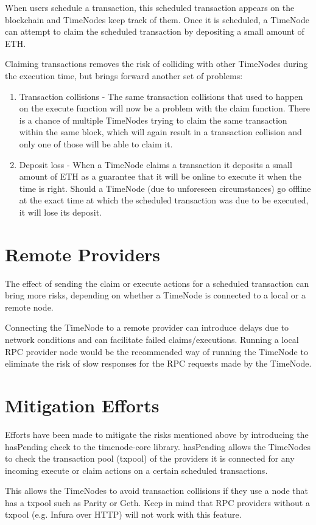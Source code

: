 \documentclass{report}
\begin{document}
  When users schedule a transaction, this scheduled transaction appears on the blockchain and TimeNodes keep track of them. Once it is scheduled, a TimeNode can attempt to claim the scheduled transaction by depositing a small amount of ETH.

  Claiming transactions removes the risk of colliding with other TimeNodes during the execution time, but brings forward another set of problems:
  \begin{enumerate}
    \item Transaction collisions - The same transaction collisions that used to happen on the execute function will now be a problem with the claim function. There is a chance of multiple TimeNodes trying to claim the same transaction within the same block, which will again result in a transaction collision and only one of those will be able to claim it.
    \item Deposit loss - When a TimeNode claims a transaction it deposits a small amount of ETH as a guarantee that it will be online to execute it when the time is right. Should a TimeNode (due to unforeseen circumstances) go offline at the exact time at which the scheduled transaction was due to be executed, it will lose its deposit.
  \end{enumerate}
  \section{Remote Providers}
  The effect of sending the claim or execute actions for a scheduled transaction can bring more risks, depending on whether a TimeNode is connected to a local or a remote node.

  Connecting the TimeNode to a remote provider can introduce delays due to network conditions and can facilitate failed claims/executions. Running a local RPC provider node would be the recommended way of running the TimeNode to eliminate the risk of slow responses for the RPC requests made by the TimeNode.
  \section{Mitigation Efforts}
  Efforts have been made to mitigate the risks mentioned above by introducing the hasPending check to the timenode-core library. hasPending allows the TimeNodes to check the transaction pool (txpool) of the providers it is connected for any incoming execute or claim actions on a certain scheduled transactions.

  This allows the TimeNodes to avoid transaction collisions if they use a node that has a txpool such as Parity or Geth. Keep in mind that RPC providers without a txpool (e.g. Infura over HTTP) will not work with this feature.
\end{document}
